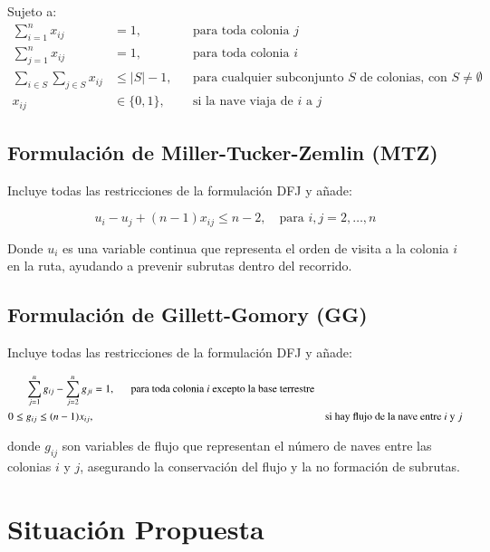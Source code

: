\documentclass[
	spanish, %
	oneside
]{article}
\begin{document}
Sujeto a:
\begin{align}
    \sum_{i=1}^{n} x_{ij} &= 1, && \text{para toda colonia } j \\
    \sum_{j=1}^{n} x_{ij} &= 1, && \text{para toda colonia } i \\
    \sum_{i \in S}\sum_{j \in S} x_{ij} &\leq |S| - 1, && \text{para cualquier subconjunto } S \text{ de colonias, con } S \neq \emptyset \\
    x_{ij} &\in \{0, 1\}, && \text{si la nave viaja de } i \text{ a } j
\end{align}

\subsection*{Formulación de Miller-Tucker-Zemlin (MTZ)}

Incluye todas las restricciones de la formulación DFJ y añade:

\begin{equation}
    u_i - u_j + (n - 1)x_{ij} \leq n - 2, \quad \text{para } i, j = 2, \ldots, n
\end{equation}

\noindent Donde \( u_i \) es una variable continua que representa el orden de visita a la colonia \( i \) en la ruta, ayudando a prevenir subrutas dentro del recorrido.

\subsection*{Formulación de Gillett-Gomory (GG)}

Incluye todas las restricciones de la formulación DFJ y añade:

\begin{align}
    \sum_{j=1}^{n} g_{ij} - \sum_{j=2}^{n} g_{ji} &= 1, \text{\indent para toda colonia } i \text{ excepto la base terrestre} \\
    0 \leq g_{ij} \leq (n - 1)x_{ij}, && \text{si hay flujo de la nave entre } i \text{ y } j
\end{align}

donde \( g_{ij} \) son variables de flujo que representan el número de naves entre las colonias \( i \) y \( j \), asegurando la conservación del flujo y la no formación de subrutas.


\section{Situación Propuesta}
\end{document}

